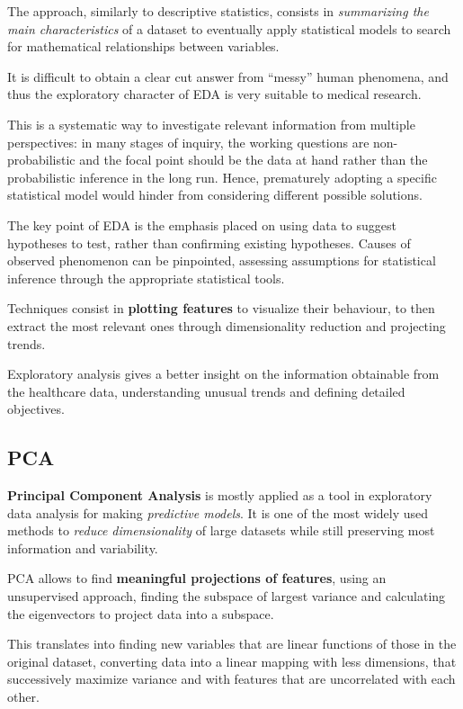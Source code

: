 The approach, similarly to descriptive statistics, consists in \textit{summarizing the main characteristics} of a dataset to eventually apply statistical models to search for mathematical relationships between variables.

It is difficult to obtain a clear cut answer from “messy” human phenomena, and thus the exploratory character of EDA is very suitable to medical research.

This is a systematic way to investigate relevant information from multiple perspectives: in many stages of inquiry, the working questions are non­-probabilistic and the focal point should be the data at hand rather than the probabilistic inference in the long run. Hence, prematurely adopting a specific statistical model would hinder from considering different possible solutions.

The key point of EDA is the emphasis placed on using data to suggest hypotheses to test, rather than confirming existing hypotheses. Causes of observed phenomenon can be pinpointed, assessing assumptions for statistical inference through the appropriate statistical tools.

Techniques consist in \textbf{plotting features} to visualize their behaviour, to then extract the most relevant ones through dimensionality reduction and projecting trends.

Exploratory analysis gives a better insight on the information obtainable from the healthcare data, understanding unusual trends and defining detailed objectives.

\subsection{PCA}
\textbf{Principal Component Analysis} is mostly applied as a tool in exploratory data analysis for making \textit{predictive models}. It is one of the most widely used methods to \textit{reduce dimensionality} of large datasets while still preserving most information and variability.

PCA allows to find \textbf{meaningful projections of features}, using an unsupervised approach, finding the subspace of largest variance and calculating the eigenvectors to project data into a subspace.

This translates into finding new variables that are linear functions of those in the original dataset, converting data into a linear mapping with less dimensions, that successively maximize variance and with features that are uncorrelated with each other\cite{pca}. 

